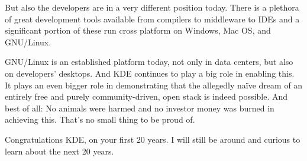 But also the developers are in a very different position today. There is a plethora of great development tools available from compilers to middleware to IDEs and a significant portion of these run cross platform on Windows, Mac OS, and GNU/Linux.
 
GNU/Linux is an established platform today, not only in data centers, but also on developers’ desktops. And KDE continues to play a big role in enabling this. It plays an even bigger role in demonstrating that the allegedly naïve dream of an entirely free and purely community-driven, open stack is indeed possible. And best of all: No animals were harmed and no investor money was burned in achieving this. That’s no small thing to be proud of.
 
Congratulations KDE, on your first 20 years. I will still be around and curious to learn about the next 20 years.
